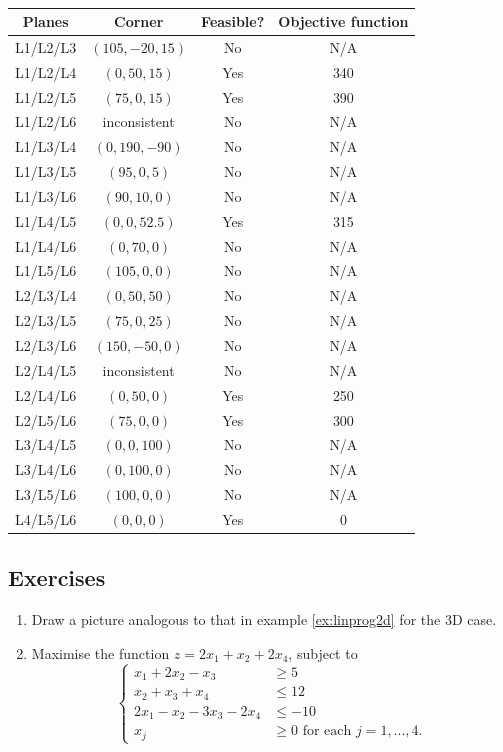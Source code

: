 \documentclass[a4paper,leqno]{article}
\numberwithin{equation}{section}
\theoremstyle{definition}
\theoremstyle{remark}
\begin{document}
\begin{table}
  \centering
  \begin{tabular}{cccc}
    \textbf{Planes} & \textbf{Corner} & \textbf{Feasible?} & \textbf{Objective function}\\\hline
    L1/L2/L3 & $ (105, -20, 15)$ & No & N/A\\
    L1/L2/L4 & $ (0,50,15) $ & Yes & 340 \\
    L1/L2/L5 & $ (75,0,15) $ & Yes & 390 \\
    L1/L2/L6 & inconsistent & No & N/A\\
    L1/L3/L4 & $ (0,190,-90) $ & No & N/A\\
    L1/L3/L5 & $ (95,0,5) $ & No & N/A \\
    L1/L3/L6 & $ (90,10,0) $ & No & N/A \\
    L1/L4/L5 & $ (0,0,52.5) $ & Yes & 315 \\
    L1/L4/L6 & $ (0,70,0) $ & No & N/A \\
    L1/L5/L6 & $ (105,0,0) $ & No & N/A \\
    L2/L3/L4 & $ (0,50,50) $ & No & N/A \\
    L2/L3/L5 & $ (75,0,25) $ & No & N/A \\
    L2/L3/L6 & $ (150,-50,0) $ & No & N/A\\
    L2/L4/L5 & inconsistent & No & N/A\\
    L2/L4/L6 & $ (0,50,0) $ & Yes & 250 \\
    L2/L5/L6 & $ (75,0,0) $ & Yes & 300 \\
    L3/L4/L5 & $ (0,0,100) $ & No & N/A \\
    L3/L4/L6 & $ (0,100,0) $ & No & N/A \\
    L3/L5/L6 & $ (100,0,0) $ & No & N/A \\
    L4/L5/L6 & $ (0,0,0) $ & Yes & 0
  \end{tabular}
  \caption{\label{tab:linprog3d}}
\end{table}

\subsection*{Exercises}
\begin{enumerate}
  \item Draw a picture analogous to that in example \ref{ex:linprog2d} for the 3D case.
  \item Maximise the function $ z = 2x_1 + x_2 + 2x_4 $, subject to
        \begin{displaymath}
          \begin{cases}
             x_1 + 2x_2 - x_3 &\geq 5\\
             x_2 + x_3 + x_4 &\leq 12\\
             2x_1 - x_2 - 3x_3 - 2x_4 &\leq -10\\
             x_j &\geq 0 \text{ for each } j = 1,...,4.
          \end{cases}
        \end{displaymath}
\end{enumerate}
\end{document}
